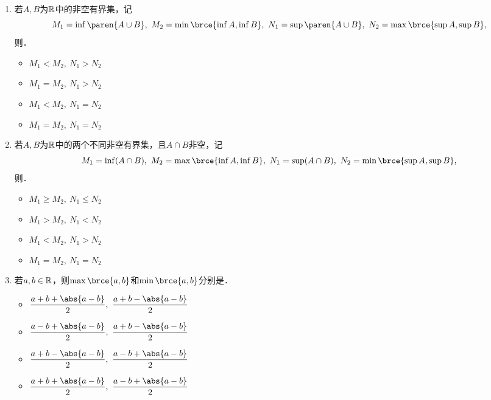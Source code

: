\documentclass[a4paper,punct=CCT]{ctexbook}
\theoremstyle{definition}
\theoremstyle{remark}
\newif\ifshowsol
\let\leq\leqslant
\let\le\leq
\let\geq\geqslant
\let\ge\geq}
\begin{document}
\begin{enumerate}
\item 若\(A, B\)为\(\mathbb{R}\)中的非空有界集，记
  \begin{equation*}
    M_1 = \inf\paren{A \cup B},\ M_2 = \min\brce{\inf A, \inf B},\ N_1 = \sup\paren{A \cup B},\ N_2 = \max\brce{\sup A, \sup B},
  \end{equation*}
  则\uline{\hspace{8em}}．
  \begin{itemize}
    \renewcommand{\labelitemi}{\faCircleThin}
  \item \(M_1 < M_2,\ N_1 > N_2\)
  \item \(M_1 = M_2,\ N_1 > N_2\)
  \item \(M_1 < M_2,\ N_1 = N_2\)
    \ifshowsol
  \item[\faCircle] \(M_1 = M_2,\ N_1 = N_2\)
    \else
  \item \(M_1 = M_2,\ N_1 = N_2\)
    \fi
  \end{itemize}

\item 若\(A, B\)为\(\mathbb{R}\)中的两个不同非空有界集，且\(A \cap B\)非空，记
  \begin{equation*}
    M_1 = \inf(A \cap B),\ M_2 = \max\brce{\inf A, \inf B},\ N_1 = \sup(A \cap B),\ N_2 = \min\brce{\sup A, \sup B},
  \end{equation*}
  则\uline{\hspace{8em}}．
  \begin{itemize}
    \renewcommand{\labelitemi}{\faCircleThin}
    \ifshowsol
  \item[\faCircle] \(M_1 \ge M_2,\ N_1 \le N_2\)
    \else
  \item \(M_1 \ge M_2,\ N_1 \le N_2\)
    \fi
  \item \(M_1 > M_2,\ N_1 < N_2\)
  \item \(M_1 < M_2,\ N_1 > N_2\)
  \item \(M_1 = M_2,\ N_1 = N_2\)
  \end{itemize}

\item \label{B1.1.1.E.9}若\(a, b \in \mathbb{R}\)，则\(\max\brce{a, b}\)和\(\min\brce{a, b}\)分别是\uline{\makebox[4em]{}}．
  \begin{itemize}
    \renewcommand{\labelitemi}{\faCircleThin}
    \ifshowsol
  \item[\faCircle] \(\displaystyle \frac{a+b+\abs{a-b}}{2},\ \frac{a+b-\abs{a-b}}{2}\)
    \else
  \item \(\displaystyle \frac{a+b+\abs{a-b}}{2},\ \frac{a+b-\abs{a-b}}{2}\)
    \fi
  \item \(\displaystyle \frac{a-b+\abs{a-b}}{2},\ \frac{a+b-\abs{a-b}}{2}\)
  \item \(\displaystyle \frac{a+b-\abs{a-b}}{2},\ \frac{a-b+\abs{a-b}}{2}\)
  \item \(\displaystyle \frac{a+b+\abs{a-b}}{2},\ \frac{a-b+\abs{a-b}}{2}\)
  \end{itemize}


\end{enumerate}
\end{document}
